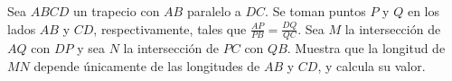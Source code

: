Sea $ABCD$ un trapecio con $AB$ paralelo a $DC$. Se toman puntos $P$ y $Q$ en los lados $AB$ y $CD$, respectivamente, tales que $\frac{AP}{PB}=\frac{DQ}{QC}$. Sea $M$ la intersección de $AQ$ con $DP$ y sea $N$ la intersección de $PC$ con $QB$. Muestra que la longitud de $MN$ depende únicamente de las longitudes de $AB$ y $CD$, y calcula su valor.